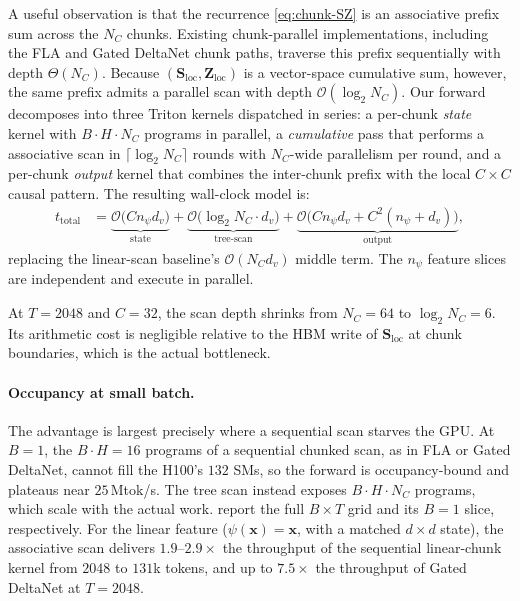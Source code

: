 \documentclass{article}
\newcommand{\1}{\bm{1}}
\newcommand{\lrbp}[1]{\!\big(#1\big)\!}
\def\vx{{\bm{x}}}
\def\mS{{\bm{S}}}
\def\mZ{{\bm{Z}}}
\def\gO{{\mathcal{O}}}
\newcommand{\seql}{T}
\theoremstyle{definition}
\begin{document}
A useful observation is that the recurrence \cref{eq:chunk-SZ} is an associative prefix sum across
the $N_C$ chunks. Existing chunk-parallel implementations, including the FLA and Gated DeltaNet
chunk paths, traverse this prefix sequentially with depth $\Theta(N_C)$. Because
$(\mS_\text{loc},\mZ_\text{loc})$ is a vector-space cumulative sum, however, the same prefix admits
a parallel scan with depth $\gO(\log_2 N_C)$. Our forward decomposes
into three Triton kernels dispatched in series: a per-chunk \emph{state} kernel with
$B\!\cdot\!H\!\cdot\!N_C$ programs in parallel, a \emph{cumulative} pass that performs a
associative scan in $\lceil\log_2 N_C\rceil$ rounds with $N_C$-wide parallelism per
round, and a per-chunk \emph{output} kernel that combines the inter-chunk prefix with the local
$C\!\times\!C$ causal pattern. The resulting wall-clock model is:
\begin{align*}
  t_\text{total}
  &=\underbrace{\gO\lrbp{C n_\psi d_v}}_{\text{state}}
  +\underbrace{\gO\lrbp{\log_2 N_C\cdot d_v}}_{\text{tree-scan}}
  +\underbrace{\gO\lrbp{C n_\psi d_v+C^2(n_\psi+d_v)}}_{\text{output}},
\end{align*}
replacing the linear-scan baseline's $\gO(N_C d_v)$ middle term. The $n_\psi$ feature slices are independent and execute in parallel.

At $\seql{=}2048$ and $C{=}32$, the scan depth shrinks from $N_C{=}64$ to
$\log_2 N_C{=}6$. Its arithmetic cost is negligible relative to the HBM write of
$\mS_\text{loc}$ at chunk boundaries, which is the actual bottleneck.\par

\paragraph{Occupancy at small batch.} The advantage is largest precisely where a sequential scan
starves the GPU. At $B{=}1$, the $B\!\cdot\!H{=}16$ programs of a sequential chunked scan, as in
FLA or Gated DeltaNet, cannot fill the H100's $132$ SMs, so the forward is occupancy-bound and
plateaus near $25$\,Mtok/s. The tree scan instead exposes $B\!\cdot\!H\!\cdot\!N_C$ programs, which
scale with the actual work.  report the full
$B\times\seql$ grid and its $B=1$ slice, respectively. For the linear feature
($\psi(\vx)=\vx$, with a matched $d\times d$ state), the associative scan delivers
$\mathbf{1.9}$--$\mathbf{2.9\times}$ the throughput of the sequential linear-chunk kernel from $2048$
to $131$k tokens, and up to $7.5\times$ the throughput of Gated DeltaNet at $\seql=2048$.\par
\end{document}
